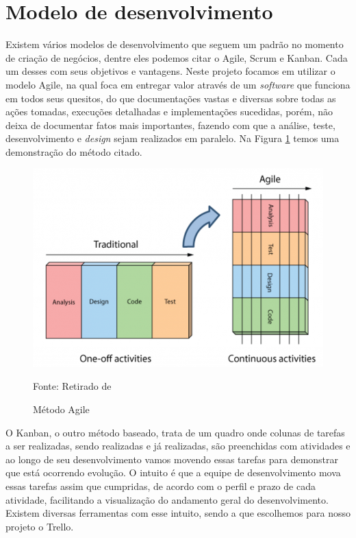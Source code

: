\documentclass[../../layout.tex]{subfiles}
\begin{document}
\section{Modelo de desenvolvimento}
\hspace*{3em}Existem vários modelos de desenvolvimento que seguem um padrão no momento de criação de negócios, dentre eles podemos citar o Agile, Scrum e Kanban. Cada um desses com seus objetivos e vantagens. Neste projeto focamos em utilizar o modelo Agile, na qual foca em entregar valor através de um \emph{software} que funciona em todos seus quesitos, do que documentações vastas e diversas sobre todas as ações tomadas, execuções detalhadas e implementações sucedidas, porém, não deixa de documentar fatos mais importantes, fazendo com que a análise, teste, desenvolvimento e \emph{design} sejam realizados em paralelo. Na Figura \ref{fig:agile} temos uma demonstração do método citado.

\begin{figure}[H]
\centering
\caption{Método Agile}
\includegraphics[width=1\textwidth]{assets/static/img/agile.jpg}
\label{fig:agile}

\begin{minipage}{0.5\textwidth}
\raggedright \footnotesize Fonte: Retirado de \cite{agile}
\end{minipage}
\end{figure}

\hspace*{3em}O Kanban, o outro método baseado, trata de um quadro onde colunas de tarefas a ser realizadas, sendo realizadas e já realizadas, são preenchidas com atividades e ao longo de seu desenvolvimento vamos movendo essas tarefas para demonstrar que está ocorrendo evolução. O intuito é que a equipe de desenvolvimento mova essas tarefas assim que cumpridas, de acordo com o perfil e prazo de cada atividade, facilitando a visualização do andamento geral do desenvolvimento. Existem diversas ferramentas com esse intuito, sendo a que escolhemos para nosso projeto o Trello.
\end{document}
